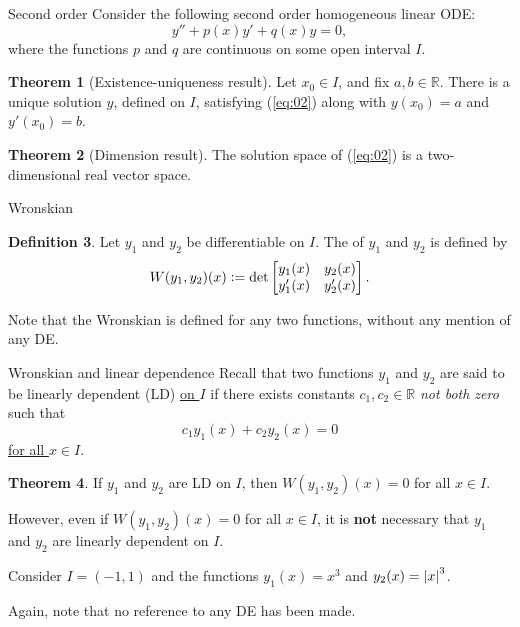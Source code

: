 \documentclass[dvipsnames]{beamer}
\theoremstyle{definition}
\newtheorem{thm}{Theorem}
\newtheorem{defn}[thm]{Definition}
\begin{document}
\begin{frame}{Second order}
  Consider the following second order homogeneous linear ODE:
  \begin{equation} \label{eq:02}
    y'' + p(x) y' + q(x) y = 0,
  \end{equation}
  where the functions $p$ and $q$ are continuous on some open interval $I$. \pause

  \begin{thm}[Existence-uniqueness result]
    Let $x_{0} \in I$, and fix $a, b \in \mathbb{R}$. \pause There is a unique solution $y$, defined on $I$, satisfying (\ref{eq:02}) along with $y(x_{0}) = a$ and $y'(x_{0}) = b$.
  \end{thm} \pause

  \begin{thm}[Dimension result]
    The solution space of (\ref{eq:02}) is a two-dimensional real vector space.
  \end{thm}
\end{frame}
\begin{frame}{Wronskian}
  \begin{defn}
    Let $y_{1}$ and $y_{2}$ be differentiable on $I$. \pause The  of $y_{1}$ and $y_{2}$ is defined by \pause
    \begin{equation*} 
      W(y_{1}, y_{2})(x) \vcentcolon= \det 
      \begin{bmatrix}
        y_{1}(x) & y_{2}(x) \\
        y_{1}'(x) & y_{2}'(x)
      \end{bmatrix}.
    \end{equation*}
  \end{defn} \pause

  Note that the Wronskian is defined for any two functions, without any mention of any DE.
\end{frame}
\begin{frame}{Wronskian and linear dependence}
  Recall that two functions $y_{1}$ and $y_{2}$ are said to be linearly dependent (LD) \underline{on $I$} \pause if there exists constants $c_{1}, c_{2} \in \mathbb{R}$ \emph{not both zero} such that \pause
  \begin{equation*} 
    c_{1} y_{1}(x) + c_{2} y_{2}(x) = 0
  \end{equation*} \pause
  \underline{for all $x \in I$}. \pause 

  \begin{thm}
    If $y_{1}$ and $y_{2}$ are LD on $I$, then $W(y_{1}, y_{2})(x) = 0$ for all $x \in I$.
  \end{thm} \pause

  However, even if $W(y_{1}, y_{2})(x) = 0$ for all $x \in I$, it is \textbf{not} necessary that $y_{1}$ and $y_{2}$ are linearly dependent on $I$. \pause

  Consider $I = (-1, 1)$ and the functions $y_{1}(x) = x^{3}$ and $y_{2}(x) = {\left\lvert x \right\lvert}^{3}$. \pause

  Again, note that no reference to any DE has been made.
\end{frame}
\end{document}
